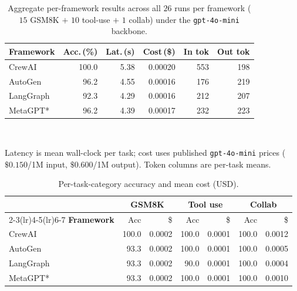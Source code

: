 \begin{table}[t]
\caption{Aggregate per-framework results across all $26$ runs per framework
($15$ GSM8K $+$ $10$ tool-use $+$ $1$ collab) under the
\texttt{gpt-4o-mini} backbone.}
\label{tab:summary}
\centering
\footnotesize
\setlength{\tabcolsep}{4pt}
\begin{tabular}{lrrrrr}
\toprule
\textbf{Framework} & \textbf{Acc.\,(\%)} & \textbf{Lat.\,(s)} & \textbf{Cost\,(\$)} & \textbf{In tok} & \textbf{Out tok} \\
\midrule
CrewAI    & 100.0 & 5.38 & 0.00020 & 553 & 198 \\
AutoGen   & 96.2  & 4.55 & 0.00016 & 176 & 219 \\
LangGraph & 92.3  & 4.29 & 0.00016 & 212 & 207 \\
MetaGPT*  & 96.2  & 4.39 & 0.00017 & 232 & 223 \\
\bottomrule
\end{tabular}
\vspace{2pt}
\\\raggedright\scriptsize Latency is mean wall-clock per task; cost uses
published \texttt{gpt-4o-mini} prices ($\$0.150$/1M input,
$\$0.600$/1M output). Token columns are per-task means.
\end{table}

\begin{table}[t]
\caption{Per-task-category accuracy and mean cost (USD).}
\label{tab:percat}
\centering
\footnotesize
\setlength{\tabcolsep}{4pt}
\begin{tabular}{lrrrrrr}
\toprule
& \multicolumn{2}{c}{\textbf{GSM8K}} & \multicolumn{2}{c}{\textbf{Tool use}} & \multicolumn{2}{c}{\textbf{Collab}} \\
\cmidrule(lr){2-3}\cmidrule(lr){4-5}\cmidrule(lr){6-7}
\textbf{Framework} & Acc & \$ & Acc & \$ & Acc & \$ \\
\midrule
CrewAI    & 100.0 & 0.0002 & 100.0 & 0.0001 & 100.0 & 0.0012 \\
AutoGen   &  93.3 & 0.0002 & 100.0 & 0.0001 & 100.0 & 0.0005 \\
LangGraph &  93.3 & 0.0002 &  90.0 & 0.0001 & 100.0 & 0.0004 \\
MetaGPT*  &  93.3 & 0.0002 & 100.0 & 0.0001 & 100.0 & 0.0010 \\
\bottomrule
\end{tabular}
\end{table}
